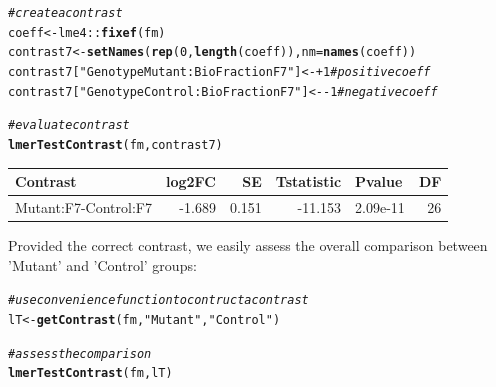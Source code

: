 \documentclass[11pt]{elife}\usepackage[]{graphicx}\usepackage[]{color}
\makeatletter
\newcommand{\hlnum}[1]{\textcolor[rgb]{0.686,0.059,0.569}{#1}}%
\newcommand{\hlstr}[1]{\textcolor[rgb]{0.192,0.494,0.8}{#1}}%
\newcommand{\hlcom}[1]{\textcolor[rgb]{0.678,0.584,0.686}{\textit{#1}}}%
\newcommand{\hlopt}[1]{\textcolor[rgb]{0,0,0}{#1}}%
\newcommand{\hlstd}[1]{\textcolor[rgb]{0.345,0.345,0.345}{#1}}%
\newcommand{\hlkwb}[1]{\textcolor[rgb]{0.69,0.353,0.396}{#1}}%
\newcommand{\hlkwc}[1]{\textcolor[rgb]{0.333,0.667,0.333}{#1}}%
\newcommand{\hlkwd}[1]{\textcolor[rgb]{0.737,0.353,0.396}{\textbf{#1}}}%
\newenvironment{kframe}{%
 \def\at@end@of@kframe{}%
 \ifinner\ifhmode%
  \def\at@end@of@kframe{\end{minipage}}%
  \begin{minipage}{\columnwidth}%
 \fi\fi%
 \def\FrameCommand##1{\hskip\@totalleftmargin \hskip-\fboxsep
 \colorbox{shadecolor}{##1}\hskip-\fboxsep
     \hskip-\linewidth \hskip-\@totalleftmargin \hskip\columnwidth}%
 \MakeFramed {\advance\hsize-\width
   \@totalleftmargin\z@ \linewidth\hsize
   \@setminipage}}%
 {\par\unskip\endMakeFramed%
 \at@end@of@kframe}
\newenvironment{knitrout}{}{} %
\makeatother
\begin{document}
\begin{knitrout}
\color{fgcolor}\begin{kframe}
\begin{alltt}
\hlcom{# create a contrast}
\hlstd{coeff} \hlkwb{<-} \hlstd{lme4}\hlopt{::}\hlkwd{fixef}\hlstd{(fm)}
\hlstd{contrast7} \hlkwb{<-} \hlkwd{setNames}\hlstd{(}\hlkwd{rep}\hlstd{(}\hlnum{0}\hlstd{,}\hlkwd{length}\hlstd{(coeff)),} \hlkwc{nm} \hlstd{=} \hlkwd{names}\hlstd{(coeff))}
\hlstd{contrast7[}\hlstr{"GenotypeMutant:BioFractionF7"}\hlstd{]} \hlkwb{<-} \hlopt{+}\hlnum{1} \hlcom{# positive coeff}
\hlstd{contrast7[}\hlstr{"GenotypeControl:BioFractionF7"}\hlstd{]} \hlkwb{<-} \hlopt{-}\hlnum{1} \hlcom{# negative coeff}

\hlcom{# evaluate contrast}
\hlkwd{lmerTestContrast}\hlstd{(fm, contrast7)}
\end{alltt}
\end{kframe}
\end{knitrout}

\begin{knitrout}
\color{fgcolor}
\begin{tabular}{l|r|r|r|l|r}
\hline
Contrast & log2FC & SE & Tstatistic & Pvalue & DF\\
\hline
Mutant:F7-Control:F7 & -1.689 & 0.151 & -11.153 & 2.09e-11 & 26\\
\hline
\end{tabular}


\end{knitrout}

Provided the correct contrast, we easily assess the overall comparison between 
'Mutant' and 'Control' groups:

\begin{knitrout}
\color{fgcolor}\begin{kframe}
\begin{alltt}
\hlcom{# use convenience function to contruct a contrast}
\hlstd{lT} \hlkwb{<-} \hlkwd{getContrast}\hlstd{(fm,} \hlstr{"Mutant"}\hlstd{,}\hlstr{"Control"}\hlstd{)}

\hlcom{# assess the comparison}
\hlkwd{lmerTestContrast}\hlstd{(fm, lT)}
\end{alltt}
\end{kframe}
\end{knitrout}
\end{document}
